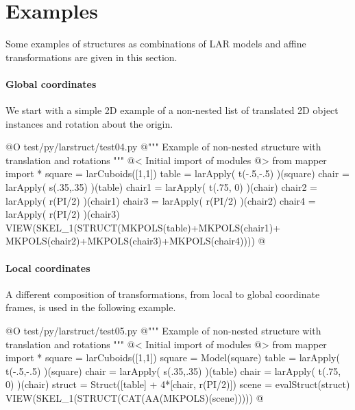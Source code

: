 \documentclass[11pt,oneside]{article}    %
\begin{document}
\section{Examples}
Some examples of structures as combinations of LAR models and affine transformations are given in this section. 

\paragraph{Global coordinates}
We start with a simple 2D example of a non-nested list of translated 2D object instances and rotation about the origin.

@O test/py/larstruct/test04.py
@{""" Example of non-nested structure with translation and rotations """
@< Initial import of modules @>
from mapper import *
square = larCuboids([1,1])
table = larApply( t(-.5,-.5) )(square)
chair = larApply( s(.35,.35) )(table)
chair1 = larApply( t(.75, 0) )(chair)
chair2 = larApply( r(PI/2) )(chair1)
chair3 = larApply( r(PI/2) )(chair2)
chair4 = larApply( r(PI/2) )(chair3)
VIEW(SKEL_1(STRUCT(MKPOLS(table)+MKPOLS(chair1)+
                   MKPOLS(chair2)+MKPOLS(chair3)+MKPOLS(chair4))))
@}

\paragraph{Local coordinates}
A different composition of transformations, from local to global coordinate frames, is used in the following example.

@O test/py/larstruct/test05.py
@{""" Example of non-nested structure with translation and rotations """
@< Initial import of modules @>
from mapper import *
square = larCuboids([1,1])
square = Model(square)
table = larApply( t(-.5,-.5) )(square)
chair = larApply( s(.35,.35) )(table)
chair = larApply( t(.75, 0) )(chair)
struct = Struct([table] + 4*[chair, r(PI/2)])
scene = evalStruct(struct)
VIEW(SKEL_1(STRUCT(CAT(AA(MKPOLS)(scene)))))
@}
\end{document}
